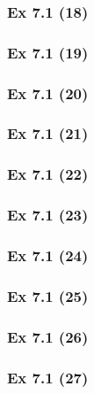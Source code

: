 \subsubsection{Ex 7.1 (18)}\label{sec:Ex_7.1.18}

\subsubsection{Ex 7.1 (19)}\label{sec:Ex_7.1.19}

\subsubsection{Ex 7.1 (20)}\label{sec:Ex_7.1.20}

\newpage		%

\subsubsection{Ex 7.1 (21)}\label{sec:Ex_7.1.21}

\subsubsection{Ex 7.1 (22)}\label{sec:Ex_7.1.22}

\subsubsection{Ex 7.1 (23)}\label{sec:Ex_7.1.23}

\subsubsection{Ex 7.1 (24)}\label{sec:Ex_7.1.24}

\subsubsection{Ex 7.1 (25)}\label{sec:Ex_7.1.25}

\subsubsection{Ex 7.1 (26)}\label{sec:Ex_7.1.26}

\subsubsection{Ex 7.1 (27)}\label{sec:Ex_7.1.27}


